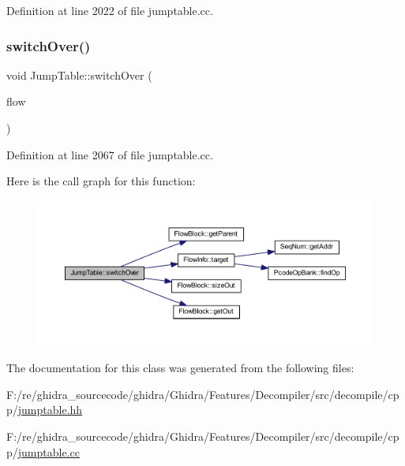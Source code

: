 Definition at line 2022 of file jumptable.\+cc.

\mbox{\label{class_jump_table_a421a6817e059ff862b9e057701da8f01}} 
\subsubsection{\texorpdfstring{switchOver()}{switchOver()}}
{\footnotesize\ttfamily void Jump\+Table\+::switch\+Over (\begin{DoxyParamCaption}\item[{const \mbox{\hyperlink{class_flow_info}{Flow\+Info}} \&}]{flow }\end{DoxyParamCaption})}



Definition at line 2067 of file jumptable.\+cc.

Here is the call graph for this function\+:
\nopagebreak
\begin{figure}[H]
\begin{center}
\leavevmode
\includegraphics[width=350pt]{class_jump_table_a421a6817e059ff862b9e057701da8f01_cgraph}
\end{center}
\end{figure}


The documentation for this class was generated from the following files\+:\begin{DoxyCompactItemize}
\item 
F\+:/re/ghidra\+\_\+sourcecode/ghidra/\+Ghidra/\+Features/\+Decompiler/src/decompile/cpp/\mbox{\hyperlink{jumptable_8hh}{jumptable.\+hh}}\item 
F\+:/re/ghidra\+\_\+sourcecode/ghidra/\+Ghidra/\+Features/\+Decompiler/src/decompile/cpp/\mbox{\hyperlink{jumptable_8cc}{jumptable.\+cc}}\end{DoxyCompactItemize}
